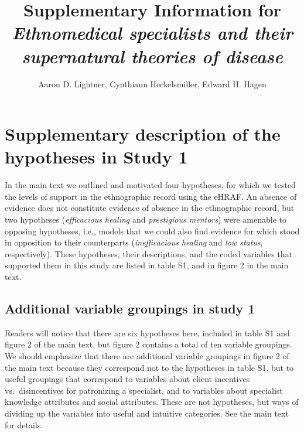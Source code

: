 \documentclass[
]{article}
\title{\LARGE \textbf{Supplementary Information for \emph{Ethnomedical specialists and their supernatural theories of disease}}}
\author{Aaron D. Lightner, Cynthiann Heckelsmiller, Edward H. Hagen}
\date{}
\begin{document}
\maketitle

{
\setcounter{tocdepth}{2}
\tableofcontents
}
\setcounter{table}{0}  
  \renewcommand{\thetable}{S\arabic{table}} 
  \setcounter{figure}{0} 
  \renewcommand{\thefigure}{S\arabic{figure}}

\hypertarget{supplementary-description-of-the-hypotheses-in-study-1}{%
\section{Supplementary description of the hypotheses in Study 1}\label{supplementary-description-of-the-hypotheses-in-study-1}}

In the main text we outlined and motivated four hypotheses, for which we tested the levels of support in the ethnographic record using the eHRAF. An absence of evidence does not constitute evidence of absence in the ethnographic record, but two hypotheses (\emph{efficacious healing} and \emph{prestigious mentors}) were amenable to opposing hypotheses, i.e., models that we could also find evidence for which stood in opposition to their counterparts (\emph{inefficacious healing} and \emph{low status}, respectively). These hypotheses, their descriptions, and the coded variables that supported them in this study are listed in table S1, and in figure 2 in the main text.

\hypertarget{additional-variable-groupings-in-study-1}{%
\subsection{Additional variable groupings in study 1}\label{additional-variable-groupings-in-study-1}}

Readers will notice that there are six hypotheses here, included in table S1 and figure 2 of the main text, but figure 2 contains a total of ten variable groupings. We should emphasize that there are additional variable groupings in figure 2 of the main text because they correspond not to the hypotheses in table S1, but to useful groupings that correspond to variables about client incentives vs.~disincentives for patronizing a specialist, and to variables about specialist knowledge attributes and social attributes. These are not hypotheses, but ways of dividing up the variables into useful and intuitive categories. See the main text for details.
\end{document}
